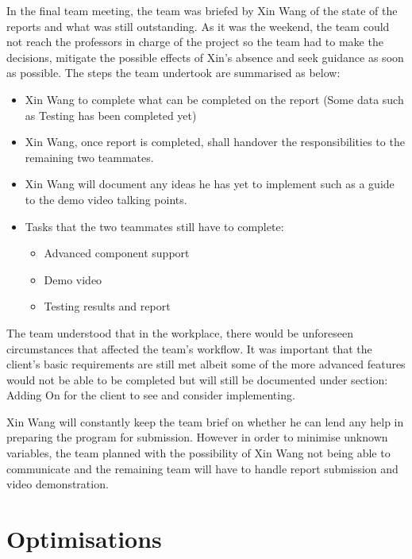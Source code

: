 \documentclass[12pt,a4paper]{article}
\begin{document}
In the final team meeting, the team was briefed by Xin Wang of the state of the reports and what was still outstanding. 
As it was the weekend, the team could not reach the professors in charge of the project so the team had to make the 
decisions, mitigate the possible effects of Xin's absence and seek guidance as soon as possible.
The steps the team undertook are summarised as below:
\begin{itemize}
	\item Xin Wang to complete what can be completed on the report (Some data such as Testing has been completed yet)
	\item Xin Wang, once report is completed, shall handover the responsibilities to the remaining two teammates.
	\item Xin Wang will document any ideas he has yet to implement such as a guide to the demo video talking points.
	\item Tasks that the two teammates still have to complete:
	\begin{itemize}
		\item Advanced component support
		\item Demo video
		\item Testing results and report  
	\end{itemize}
\end{itemize}
The team understood that in the workplace, there would be unforeseen circumstances that affected the team's workflow.
It was important that the client's basic requirements are still met albeit some of the more advanced features would not be 
able to be completed but will still be documented under section: Adding On for the client to see and consider implementing.
\par 
Xin Wang will constantly keep the team brief on whether he can lend any help in preparing the program for submission. However
in order to minimise unknown variables, the team planned with the possibility of Xin Wang not being able to communicate and the
remaining team will have to handle report submission and video demonstration.
\pagebreak
\section{Optimisations}
\end{document}
